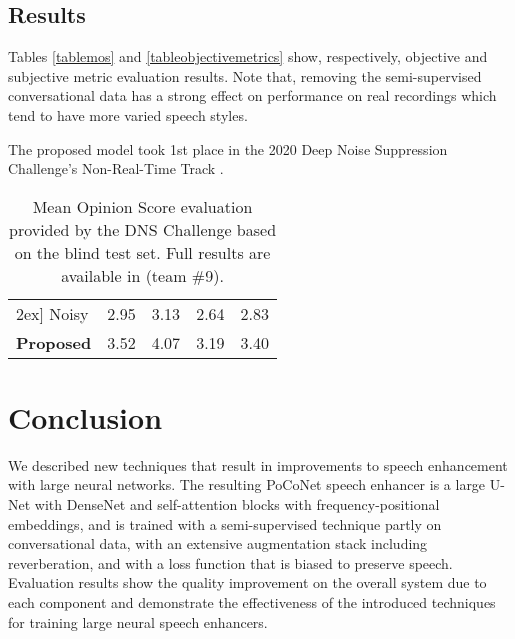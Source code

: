 \documentclass[english]{article}
\begin{document}
\subsection{Results}

Tables \ref{tablemos} and \ref{tableobjectivemetrics} show, respectively, objective and subjective metric evaluation results. Note that, removing the semi-supervised conversational data has a strong effect on performance on real recordings which tend to have more varied speech styles. 

The proposed model took 1st place in the 2020 Deep Noise Suppression Challenge's Non-Real-Time Track \cite{dnschallengefinal}. 

\begin{table}[hbt!]
\footnotesize
\centering
\begin{tabular}{lcccc} 
\hline \-2ex]
Noisy & 2.95 & 3.13 & 2.64 & 2.83 \\
\bf{Proposed}  & 3.52 & 4.07 & 3.19 & 3.40 \\
\hline 
\end{tabular}
\vspace{0.05in}
\caption{Mean Opinion Score evaluation provided by the DNS Challenge based on the blind test set. Full results are available in \cite{dnschallengefinal} (team \#9). } 
\label{tablechallengemos}
\vspace{-0.3in}
\end{table}

\section{Conclusion}

We described new techniques that result in improvements to speech enhancement with large neural networks. The resulting PoCoNet speech enhancer is a large U-Net with DenseNet and self-attention blocks with frequency-positional embeddings, and is trained with a semi-supervised technique partly on conversational data, with an extensive augmentation stack including reverberation, and with a loss function that is biased to preserve speech. Evaluation results show the quality improvement on the overall system due to each component and demonstrate the effectiveness of the introduced techniques for training large neural speech enhancers. 




\end{document}
